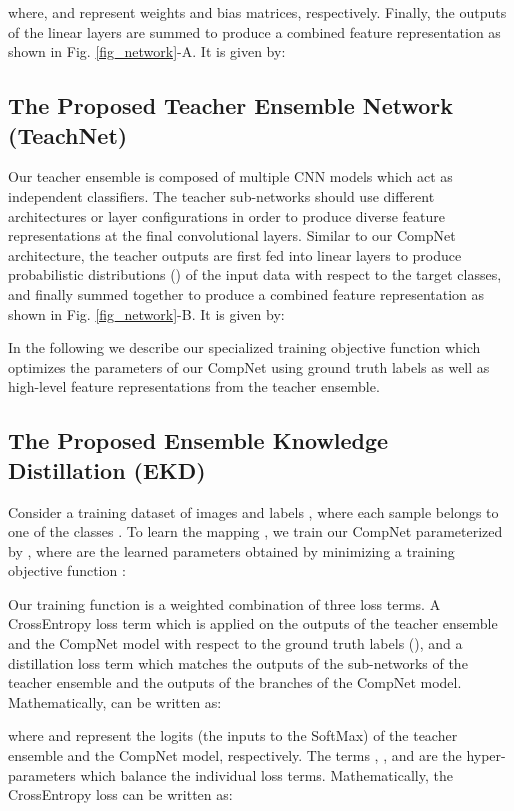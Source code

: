 \documentclass{ecai}
\begin{document}
where,  and  represent weights and bias matrices, respectively. Finally, the outputs of the linear layers are summed to produce a combined feature representation  as shown in Fig. \ref{fig_network}-A. It is given by:

\subsection{The Proposed Teacher Ensemble Network (TeachNet)}\label{teacher_network}
Our teacher ensemble is composed of multiple CNN models which act as independent classifiers. The teacher sub-networks should use different architectures or layer configurations in order to produce diverse feature representations at the final convolutional layers. 
Similar to our CompNet architecture, the teacher outputs are first fed into linear layers to produce probabilistic distributions () of the input data with respect to the target classes, and finally summed together to produce a combined feature representation  as shown in Fig. \ref{fig_network}-B. It is given by:

In the following we describe our specialized training objective function which optimizes the parameters of our CompNet using ground truth labels as well as high-level feature representations from the teacher ensemble.
\subsection{The Proposed Ensemble Knowledge Distillation (EKD)}\label{deep_network}
Consider a training dataset of images and labels , where each sample belongs to one of the  classes . 
To learn the mapping , we train our CompNet parameterized by , where  are the learned parameters obtained by minimizing a training objective function :

Our training function  is a weighted combination of three loss terms. A CrossEntropy loss term  which is applied on the outputs of the teacher ensemble and the CompNet model with respect to the ground truth labels (), and a distillation loss term  which matches the outputs of the sub-networks of the teacher ensemble and the outputs of the branches of the CompNet model. Mathematically,  can be written as:

where  and  represent the logits (the inputs to the SoftMax) of the teacher ensemble and the CompNet model, respectively. The terms , , and  are the hyper-parameters which balance the individual loss terms. Mathematically, the CrossEntropy loss  can be written as:
\end{document}
